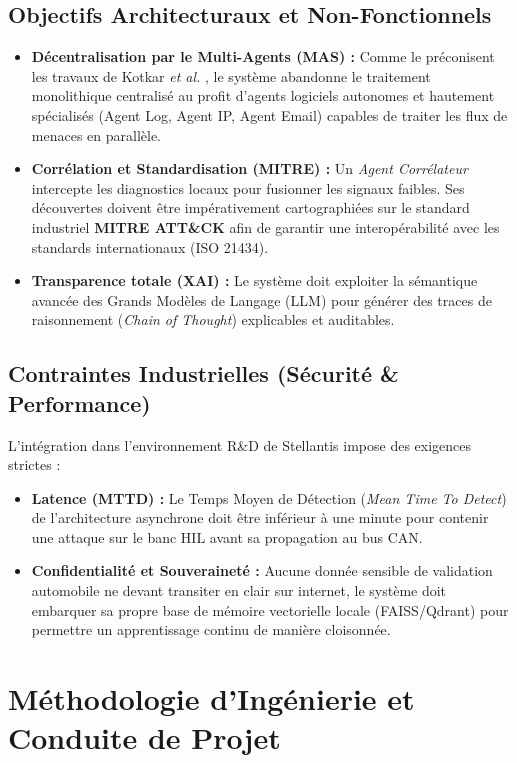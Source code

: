 \documentclass[a4paper, 12pt]{report}
\begin{document}
\subsection{Objectifs Architecturaux et Non-Fonctionnels}
\begin{itemize}
    \item \textbf{Décentralisation par le Multi-Agents (MAS) :} Comme le préconisent les travaux de Kotkar \textit{et al.} \cite{kotkar_mas}, le système abandonne le traitement monolithique centralisé au profit d'agents logiciels autonomes et hautement spécialisés (Agent Log, Agent IP, Agent Email) capables de traiter les flux de menaces en parallèle.
    \item \textbf{Corrélation et Standardisation (MITRE) :} Un \textit{Agent Corrélateur} intercepte les diagnostics locaux pour fusionner les signaux faibles. Ses découvertes doivent être impérativement cartographiées sur le standard industriel \textbf{MITRE ATT\&CK} \cite{mitre_attack} afin de garantir une interopérabilité avec les standards internationaux (ISO 21434).
    \item \textbf{Transparence totale (XAI) :} Le système doit exploiter la sémantique avancée des Grands Modèles de Langage (LLM) \cite{openai_gpt4} pour générer des traces de raisonnement (\textit{Chain of Thought}) explicables et auditables.
\end{itemize}

\subsection{Contraintes Industrielles (Sécurité \& Performance)}
L'intégration dans l'environnement R\&D de Stellantis impose des exigences strictes :
\begin{itemize}
    \item \textbf{Latence (MTTD) :} Le Temps Moyen de Détection (\textit{Mean Time To Detect}) de l'architecture asynchrone doit être inférieur à une minute pour contenir une attaque sur le banc HIL avant sa propagation au bus CAN.
    \item \textbf{Confidentialité et Souveraineté :} Aucune donnée sensible de validation automobile ne devant transiter en clair sur internet, le système doit embarquer sa propre base de mémoire vectorielle locale (FAISS/Qdrant) pour permettre un apprentissage continu de manière cloisonnée.
\end{itemize}

\section{Méthodologie d'Ingénierie et Conduite de Projet}
\label{sec:methodologie}
\end{document}
